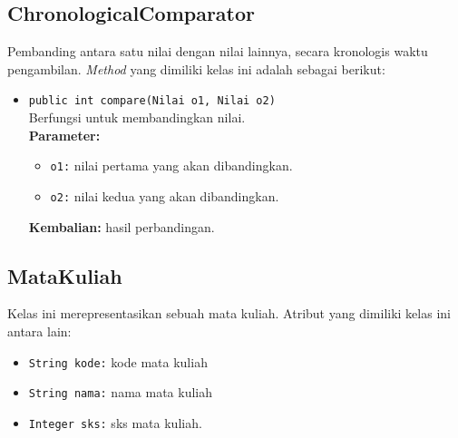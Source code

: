 \subsection{ChronologicalComparator}
Pembanding antara satu nilai dengan nilai lainnya, secara kronologis waktu pengambilan. \textit{Method} yang dimiliki kelas ini adalah sebagai berikut:

\begin{itemize}
	\item \texttt{public int compare(Nilai o1, Nilai o2) } \\
	Berfungsi untuk membandingkan nilai. \\
	\textbf{Parameter:}
	\begin{itemize}
		\item \texttt{o1:} nilai pertama yang akan dibandingkan.
		\item \texttt{o2:} nilai kedua yang akan dibandingkan.
	\end{itemize}
	\textbf{Kembalian:} hasil perbandingan.
\end{itemize}


\subsection{MataKuliah}
Kelas ini merepresentasikan sebuah mata kuliah. Atribut yang dimiliki kelas ini antara lain:
\begin{itemize}
	\item \texttt{String kode:} kode mata kuliah
	\item \texttt{String nama:} nama mata kuliah
	\item \texttt{Integer sks:} sks mata kuliah.
\end{itemize}

